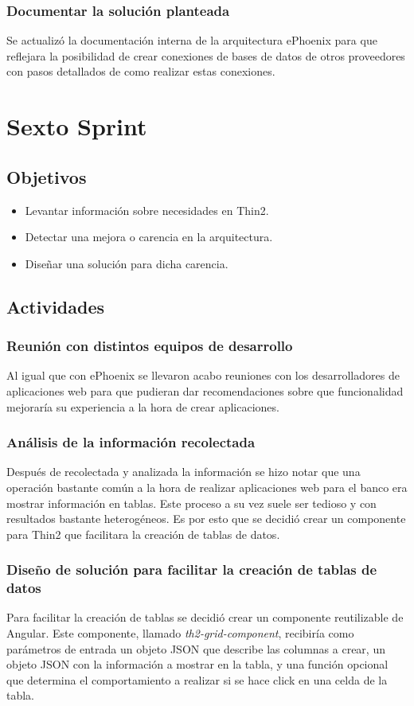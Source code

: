 \subsubsection{Documentar la solución planteada}
Se actualizó la documentación interna de la arquitectura ePhoenix para que reflejara
la posibilidad de crear conexiones de bases de datos de otros proveedores con pasos
detallados de como realizar estas conexiones.

\section{Sexto Sprint}

\subsection{Objetivos}
\begin{itemize}
  \item Levantar información sobre necesidades en Thin2.
  \item Detectar una mejora o carencia en la arquitectura.
  \item Diseñar una solución para dicha carencia.
\end{itemize}
\subsection{Actividades}
\subsubsection{Reunión con distintos equipos de desarrollo}
Al igual que con ePhoenix se llevaron acabo reuniones con los desarrolladores
de aplicaciones web para que pudieran dar recomendaciones sobre que funcionalidad
mejoraría su experiencia a la hora de crear aplicaciones.
\subsubsection{Análisis de la información recolectada}
Después de recolectada y analizada la información se hizo notar que una operación
bastante común a la hora de realizar aplicaciones web para el banco era mostrar
información en tablas. Este proceso a su vez suele ser tedioso y con resultados
bastante heterogéneos. Es por esto que se decidió crear un componente para Thin2
que facilitara la creación de tablas de datos.
\subsubsection{Diseño de solución para facilitar la creación de tablas de datos}
Para facilitar la creación de tablas se decidió crear un componente reutilizable
de Angular. Este componente, llamado \emph{th2-grid-component}, recibiría como
parámetros de entrada un objeto JSON que describe las columnas a crear, un objeto
JSON con la información a mostrar en la tabla, y una función opcional que determina
el comportamiento a realizar si se hace click en una celda de la tabla.

